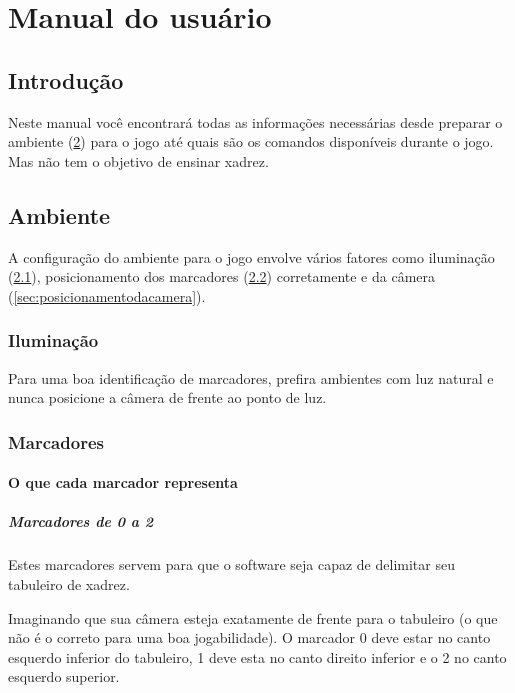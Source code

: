 \documentclass[a4paper,12pt]{book}
\begin{document}
\part{Manual do usu\'ario}
\label{part:manualdousuario}
	\chapter{Introdu\c c\~ao}
	Neste manual voc\^e encontrar\'a todas as informa\c c\~oes necess\'arias desde preparar o ambiente (\ref{ch:ambiente}) para o jogo at\'e quais s\~ao os comandos dispon\'iveis durante o jogo. Mas n\~ao tem o objetivo de ensinar xadrez.

  \chapter{Ambiente}
  \label{ch:ambiente}
  A configura\c c\~ao do ambiente para o jogo envolve v\'arios fatores como ilumina\c c\~ao (\ref{sec:iluminacao}), posicionamento dos marcadores (\ref{sec:marcadores}) corretamente e da c\^amera (\ref{sec:posicionamentodacamera}).
    \section{Ilumina\c c\~ao}
    \label{sec:iluminacao}
    Para uma boa identifica\c c\~ao de marcadores, prefira ambientes com luz natural e nunca posicione a c\^amera de frente ao ponto de luz.

    \section{Marcadores}
    \label{sec:marcadores}
      \subsection{O que cada marcador representa}
      \label{subsec:marcadorreprsenta}
        \subsubsection{Marcadores de 0 a 2}
        \label{subsubsec:marcadores0a2}
        Estes marcadores servem para que o software seja capaz de delimitar seu tabuleiro de xadrez.

        Imaginando que sua c\^amera esteja exatamente de frente para o tabuleiro (o que n\~ao \'e o correto para uma boa jogabilidade). O marcador 0 deve estar no canto esquerdo inferior do tabuleiro, 1 deve esta no canto direito inferior e o 2 no canto esquerdo superior.
\end{document}

